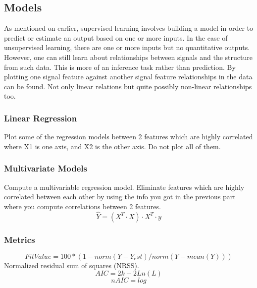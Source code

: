 \documentclass{article}
\begin{document}
\subsection{Models}
As mentioned on earlier, supervised learning involves building a model in order to predict or estimate an output based on one or more inputs. In the case of unsupervised learning, there are one or more inputs but no quantitative outputs. However, one can still learn about relationships between signals and the structure from such data. This is more of an inference task rather than prediction.
By plotting one signal feature against another signal feature relationships in the data can be found. Not only linear relations but quite possibly non-linear relationships too.
\subsubsection{Linear Regression}
Plot some of the regression models between 2 features which are highly correlated where X1 is one axis, and X2 is the other axis. Do not plot all of them.
\subsubsection{Multivariate Models}
Compute a multivariable regression model.
Eliminate features which are highly correlated between each other by using the info you got in the previous part where you compute correlations between 2 features.
$$ \hat{Y} = (X^T \cdot X) \cdot X^T \cdot y $$
\subsubsection{Metrics}
$$ FitValue = 100 * (1-norm(Y-Y_est)/norm(Y-mean(Y))) $$
Normalized residual sum of squares (NRSS).
$$ AIC = 2k - 2Ln(L) $$  
$$ nAIC = log $$
\end{document}
